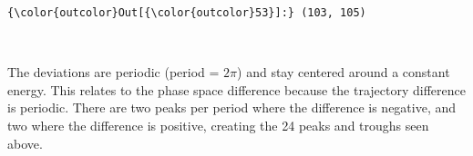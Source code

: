 \documentclass[11pt]{article}
\begin{document}
\begin{Verbatim}[commandchars=\\\{\}]
{\color{outcolor}Out[{\color{outcolor}53}]:} (103, 105)
\end{Verbatim}
            
    \begin{center}
    \end{center}
    { \hspace*{\fill} \\}
    
    The deviations are periodic (period = \(2 \pi\)) and stay centered
around a constant energy. This relates to the phase space difference
because the trajectory difference is periodic. There are two peaks per
period where the difference is negative, and two where the difference is
positive, creating the 24 peaks and troughs seen above.


    
    
    
    
\end{document}
